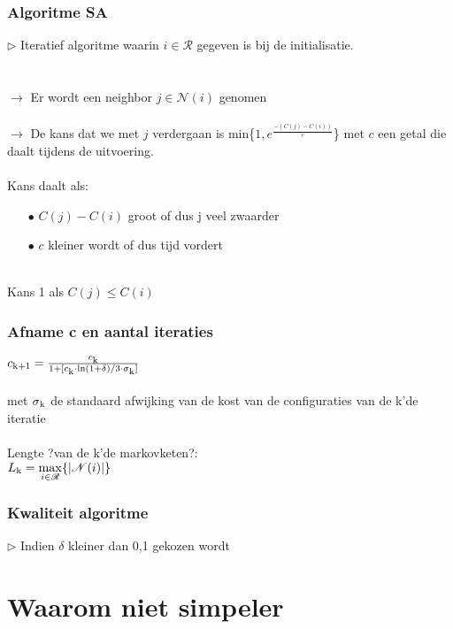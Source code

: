 \documentclass
   [kulak] %
   {kulakbeamer}
\begin{document}
\begin{frame}
	\frametitle{Algoritme SA}
	$\triangleright$ Iteratief algoritme waarin $i \in \mathscr{R}$ gegeven is bij de initialisatie. \\~\\~\\ \pause
	$\rightarrow$ Er wordt een neighbor $j \in \mathscr{N}(i)$ genomen \\~\\ \pause
	$\rightarrow$ De kans dat we met $j$ verdergaan is min\{$1,e^{\frac{-(C(j)-C(i))}{c}}$\} met $c$ een getal die daalt tijdens de uitvoering.\\~\\
	\pause
	Kans daalt als:
	\begin{itemize}
		\item[$\bullet$] $C(j)-C(i)$ groot of dus j veel zwaarder
		
		\item[$\bullet$] $c$ kleiner wordt of dus tijd vordert
		
		
	\end{itemize}
	\pause
	~\\Kans 1 als $C(j) \leqslant C(i)$
	
	
\end{frame}

\begin{frame}
	\frametitle{Afname c en aantal iteraties}
	$c\textsubscript{k+1} = \frac{c\textsubscript{k}}{1 + [c\textsubscript{k}\cdot \ln(1 + \delta)/3\cdot \sigma\textsubscript{k}]}$ \\~\\ met $\sigma\textsubscript{k}$ de standaard afwijking van de kost van de configuraties van de k'de iteratie
	\\~\\\pause
	Lengte ?van de k'de markovketen?:\\
	$L\textsubscript{k} = \displaystyle \max_{i \in \mathscr{R}}\{|\mathscr{N}(i)|\}$
\end{frame}

\begin{frame}
	\frametitle{Kwaliteit algoritme}
	
	$\triangleright$ Indien $\delta$ kleiner dan 0,1 gekozen wordt\\
	
	
\end{frame}

\section[simpeler?]{Waarom niet simpeler}
\end{document}
